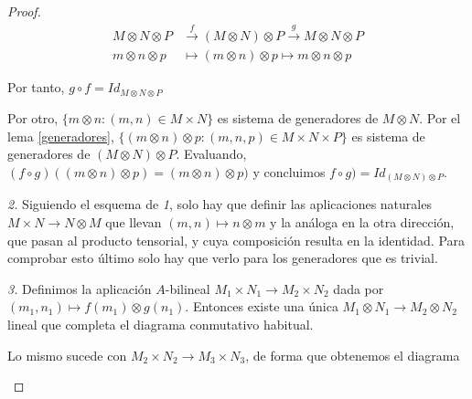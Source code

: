 \documentclass[../main.tex]{subfiles}
\begin{document}
\begin{proof}
\begin{align*}
  M\otimes N \otimes P &\overset{f}{\longrightarrow}(M\otimes N )\otimes P \overset{g}{\longrightarrow}M\otimes N \otimes P\\
  m\otimes n\otimes p &\longmapsto (m\otimes n)\otimes p \longmapsto m\otimes n\otimes p
\end{align*}

Por tanto, $g\circ f=Id_{M\otimes N\otimes P}$

Por otro, $\{m\otimes n:(m,n)\in M\times N\}$ es sistema de generadores de $M\otimes N$. Por el lema \ref{generadores}, $\{(m\otimes n)\otimes p: (m,n,p)\in M\times N\times P\}$ es sistema de generadores de $(M\otimes N)\otimes P$. Evaluando, $(f\circ g)((m\otimes n)\otimes p)=(m\otimes n)\otimes p)$ y concluimos $f\circ g)=Id_{(M\otimes N)\otimes P}$.

\textit{2.} Siguiendo el esquema de \textit{1}, solo hay que definir las aplicaciones naturales $M\times N \to N\otimes M$ que llevan $(m,n)\mapsto n\otimes m$ y la análoga en la otra dirección, que pasan al producto tensorial, y cuya composición resulta en la identidad. Para comprobar esto último solo hay que verlo para los generadores que es trivial.

\textit{3.} Definimos la aplicación $A$-bilineal $M_1\times N_1 \to M_2\times N_2$ dada por $(m_1,n_1) \mapsto f(m_1)\otimes g(n_1)$. Entonces existe una única $M_1\otimes N_1 \to M_2 \otimes N_2$ lineal que completa el diagrama conmutativo habitual.

Lo mismo sucede con $M_2\times N_2 \to M_3\times N_3$, de forma que obtenemos el diagrama

\begin{figure}[h!]
  \centering



  \begin{tikzpicture}[x=0.75pt,y=0.75pt,yscale=-1,xscale=1]



\end{tikzpicture}
\end{figure}
\end{proof}
\end{document}
